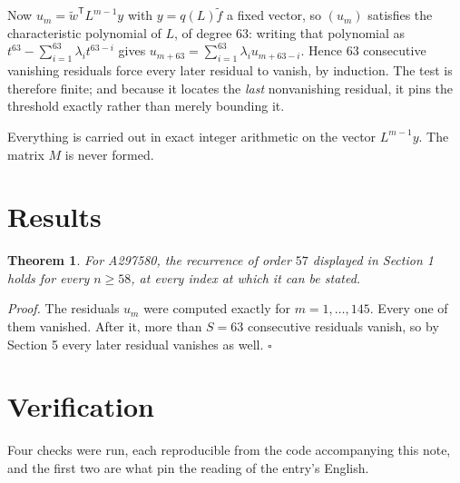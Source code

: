 \documentclass[11pt]{article}
\newtheorem{theorem}{Theorem}
\theoremstyle{definition}
\begin{document}
Now $u_m = \tilde w^{\mathsf T} L^{m-1} y$ with $y = q(L)\tilde f$ a fixed vector, so $(u_m)$ satisfies the characteristic polynomial of $L$, of degree $63$: writing that polynomial as $t^{63} - \sum_{i=1}^{63} \lambda_i t^{63-i}$ gives $u_{m+63} = \sum_{i=1}^{63} \lambda_i u_{m+63-i}$. Hence $63$ consecutive vanishing residuals force every later residual to vanish, by induction. The test is therefore finite; and because it locates the {\itshape last} nonvanishing residual, it pins the threshold exactly rather than merely bounding it.

Everything is carried out in exact integer arithmetic on the vector $L^{m-1}y$. The matrix $M$ is never formed.

\section{Results}

\begin{theorem} For A297580, the recurrence of order $57$ displayed in Section 1 holds for every $n \ge 58$, at every index at which it can be stated.\end{theorem}

{\itshape Proof.} The residuals $u_m$ were computed exactly for $m = 1,\dots,145$. Every one of them vanished. After it, more than $S = 63$ consecutive residuals vanish, so by Section 5 every later residual vanishes as well. $\square$

\section{Verification}

Four checks were run, each reproducible from the code accompanying this note, and the first two are what pin the reading of the entry's English.
\end{document}
